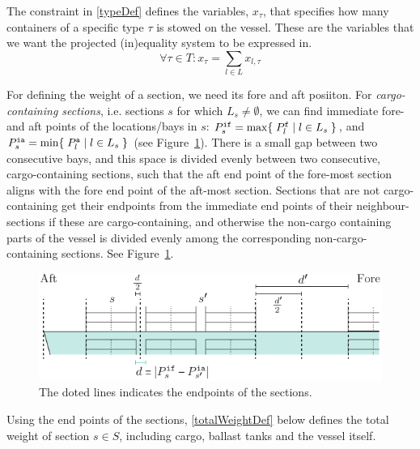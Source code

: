 The constraint in \eqref{typeDef} defines the variables, $x_\tau$, that specifies how many containers of a specific type $\tau$ is stowed on the vessel. These are the variables that we want the projected (in)equality system to be expressed in.
\begin{equation}
\label{typeDef}
	\forall{\tau \in T}: x_\tau = \sum_{l\in L} x_{l,\tau}
\end{equation}

For defining the weight of a section, we need its fore and aft posiiton. For \emph{cargo-containing sections}, i.e. sections $s$ for which $L_s\neq \emptyset$, we can find immediate fore- and aft points of the locations/bays in $s$: $P^{\texttt{if}}_s = \max\{\;{P^{\texttt{f}}_l}\;|\;{l\in L_s}\;\}$, and $P^{\texttt{ia}}_s = \min\{\;{P^{\texttt{a}}_l}\;|\;{l\in L_s}\;\}$ (see Figure~\ref{fig:sections}). 
There is a small gap between two consecutive bays, and this space is divided evenly between two consecutive, cargo-containing sections, such that the aft end point of the fore-most section aligns with the fore end point of the aft-most section. Sections that are not cargo-containing get their endpoints from the immediate end points of their neighbour-sections if these are cargo-containing, and otherwise the non-cargo containing parts of the vessel is divided evenly among the corresponding non-cargo-containing sections. See Figure~\ref{fig:sections}.

\begin{figure}
	\centering
		\includegraphics{figures/sections.pdf}
	\caption{The doted lines indicates the endpoints of the sections.}
	\label{fig:sections}
\end{figure}

Using the end points of the sections, \eqref{totalWeightDef} below defines the total weight of section $s\in S$, including cargo, ballast tanks and the vessel itself.   

